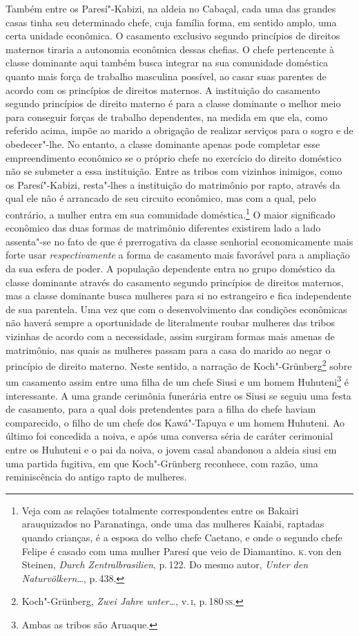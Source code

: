 Também entre os Paresí"-Kabizi, na
aldeia no Cabaçal, cada uma das grandes casas tinha seu determinado
chefe, cuja família forma, em sentido amplo, uma certa unidade
econômica. O casamento exclusivo segundo princípios de direitos maternos
tiraria a autonomia econômica dessas chefias. O chefe pertencente à
classe dominante aqui também busca integrar na sua comunidade doméstica
quanto mais força de trabalho masculina possível, ao casar suas
parentes de acordo com os princípios de direitos maternos. A
instituição do casamento segundo princípios de direito materno é para a
classe dominante o melhor meio para conseguir forças de trabalho
dependentes, na medida em que ela, como referido acima, impõe ao marido
a obrigação de realizar serviços para o sogro e de obedecer"-lhe. No entanto, 
a classe dominante apenas pode completar esse empreendimento
econômico se o próprio chefe no exercício do direito doméstico não se
submeter a essa instituição. Entre as tribos com vizinhos inimigos, como
os Paresí"-Kabizi, resta"-lhes a instituição do matrimônio por rapto,
através da qual ele não é arrancado de seu circuito econômico, mas com a
qual, pelo contrário, a mulher entra em sua comunidade
doméstica.\footnote{Veja com as relações totalmente correspondentes entre
  os Bakairi arauquizados no Paranatinga, onde uma das mulheres Kaiabi,
  raptadas quando crianças, é a esposa do velho chefe Caetano, e onde o
  segundo chefe Felipe é casado com uma mulher Paresí que veio de
  Diamantino. \textsc{k}.\,von den Steinen, \textit{Durch Zentralbrasilien}, p.\,122.
  Do mesmo autor, \textit{Unter den Naturvölkern\ldots}, p.\,438.} 
  O maior significado econômico das duas formas de matrimônio
diferentes existirem lado a lado assenta"-se no fato de que é prerrogativa da
classe senhorial economicamente mais forte usar \textit{respectivamente} a forma
de casamento mais favorável para a ampliação da sua esfera de poder. A
população dependente entra no grupo doméstico da classe dominante
através do casamento segundo princípios de direitos maternos, mas a
classe dominante busca mulheres para si no estrangeiro e fica
independente de sua parentela. Uma vez que com o desenvolvimento das
condições econômicas não haverá sempre a oportunidade de
literalmente roubar mulheres das tribos vizinhas de acordo com a
necessidade, assim surgiram formas mais amenas de matrimônio, nas
quais as mulheres passam para a casa do marido ao negar o princípio de
direito materno. Neste sentido, a narração de Koch"-Grünberg\footnote{Koch"-Grünberg,
  \textit{Zwei Jahre unter\ldots}, v.\,\textsc{i}, p.\,180\,\textsc{ss}.}
sobre um casamento assim entre uma filha de um chefe Siusi e um homem
Huhuteni\footnote{Ambas as tribos são Aruaque.} é interessante. A uma grande cerimônia
funerária entre os Siusi se seguiu uma festa de casamento, para a qual
dois pretendentes para a filha do chefe haviam comparecido, o filho de
um chefe dos Kawá"-Tapuya e um homem Huhuteni. Ao último foi concedida a
noiva, e após uma conversa séria de caráter cerimonial entre os Huhuteni
e o pai da noiva, o jovem casal abandonou a aldeia siusi em uma partida
fugitiva, em que Koch"-Grünberg reconhece, com razão, uma reminiscência
do antigo rapto de mulheres.

